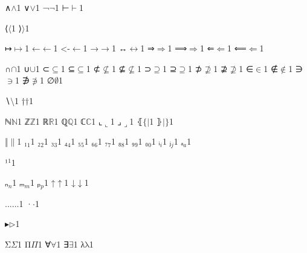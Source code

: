 {{∧}{{\ensuremath{\wedge}}}1
{∨}{{\ensuremath{\vee}}}1
{¬}{{\ensuremath{\neg}}}1
{⊢}{{\ensuremath{\vdash}}}1

{⟨}{{\ensuremath{\langle}}}1
{⟩}{{\ensuremath{\rangle}}}1

{↦}{{\ensuremath{\mapsto}}}1
{←}{{\ensuremath{\leftarrow}}}1
{<-}{{\ensuremath{\leftarrow}}}1
{→}{{\ensuremath{\rightarrow}}}1
{↔}{{\ensuremath{\leftrightarrow}}}1
{⇒}{{\ensuremath{\Rightarrow}}}1
{⟹}{{\ensuremath{\Longrightarrow}}}1
{⇐}{{\ensuremath{\Leftarrow}}}1
{⟸}{{\ensuremath{\Longleftarrow}}}1

{∩}{{\ensuremath{\cap}}}1
{∪}{{\ensuremath{\cup}}}1
{⊂}{{\ensuremath{\subseteq}}}1
{⊆}{{\ensuremath{\subseteq}}}1
{⊄}{{\ensuremath{\nsubseteq}}}1
{⊈}{{\ensuremath{\nsubseteq}}}1
{⊃}{{\ensuremath{\supseteq}}}1
{⊇}{{\ensuremath{\supseteq}}}1
{⊅}{{\ensuremath{\nsupseteq}}}1
{⊉}{{\ensuremath{\nsupseteq}}}1
{∈}{{\ensuremath{\in}}}1
{∉}{{\ensuremath{\notin}}}1
{∋}{{\ensuremath{\ni}}}1
{∌}{{\ensuremath{\notni}}}1
{∅}{{\ensuremath{\emptyset}}}1

{∖}{{\ensuremath{\setminus}}}1
{†}{{\ensuremath{\dag}}}1

{ℕ}{{\ensuremath{\mathbb{N}}}}1
{ℤ}{{\ensuremath{\mathbb{Z}}}}1
{ℝ}{{\ensuremath{\mathbb{R}}}}1
{ℚ}{{\ensuremath{\mathbb{Q}}}}1
{ℂ}{{\ensuremath{\mathbb{C}}}}1
{⌞}{{\ensuremath{\llcorner}}}1
{⌟}{{\ensuremath{\lrcorner}}}1
{⦃}{{\ensuremath{\{\!|}}}1
{⦄}{{\ensuremath{|\!\}}}}1

{‖}{{\ensuremath{\|}}}1
{₁}{{\ensuremath{_1}}}1
{₂}{{\ensuremath{_2}}}1
{₃}{{\ensuremath{_3}}}1
{₄}{{\ensuremath{_4}}}1
{₅}{{\ensuremath{_5}}}1
{₆}{{\ensuremath{_6}}}1
{₇}{{\ensuremath{_7}}}1
{₈}{{\ensuremath{_8}}}1
{₉}{{\ensuremath{_9}}}1
{₀}{{\ensuremath{_0}}}1
{ᵢ}{{\ensuremath{_i}}}1
{ⱼ}{{\ensuremath{_j}}}1
{ₐ}{{\ensuremath{_a}}}1

{¹}{{\ensuremath{^1}}}1

{ₙ}{{\ensuremath{_n}}}1
{ₘ}{{\ensuremath{_m}}}1
{ₚ}{{\ensuremath{_p}}}1
{↑}{{\ensuremath{\uparrow}}}1
{↓}{{\ensuremath{\downarrow}}}1

{...}{{\ensuremath{\ldots}}}1
{·}{{\ensuremath{\cdot}}}1

{▸}{{\ensuremath{\triangleright}}}1

{Σ}{{\color{symbolcolor}\ensuremath{\Sigma}}}1
{Π}{{\color{symbolcolor}\ensuremath{\Pi}}}1
{∀}{{\color{symbolcolor}\ensuremath{\forall}}}1
{∃}{{\color{symbolcolor}\ensuremath{\exists}}}1
{λ}{{\color{symbolcolor}\ensuremath{\mathrm{\lambda}}}}1

}
